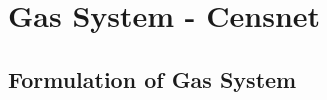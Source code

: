 \chapter{Gas System - Censnet} \label{cap:mpcc}

\section{Formulation of Gas System} \label{sec:formulation}


